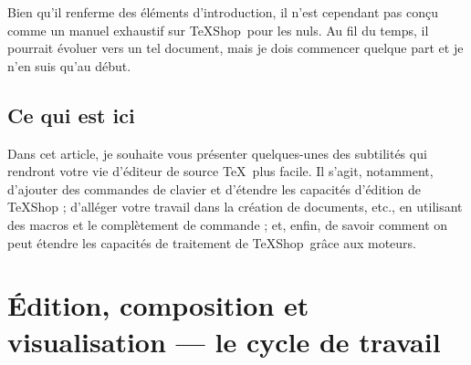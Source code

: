 \documentclass[11pt,french]{article}
\newcommand{\TS}{\textsf{\TeX Shop}}
\begin{document}
Bien qu'il renferme des éléments d'introduction, il n'est cependant pas conçu comme un manuel exhaustif sur \TS\ pour les nuls. Au fil du temps, il pourrait évoluer vers un tel document, mais je dois commencer quelque part et je n'en suis qu'au début.



\subsection{Ce qui est ici}

Dans cet article, je souhaite vous présenter quelques-unes des subtilités qui rendront votre vie d'éditeur de source \TeX\ plus facile. Il s'agit, notamment, d'ajouter des commandes de clavier et d'étendre les capacités d'édition de \TS{} ; d'alléger votre travail dans la création de documents, etc., en utilisant des macros et le complètement de commande ; et, enfin, de savoir comment on peut étendre les capacités de traitement de \TS\ grâce aux moteurs.



\section{Édition, composition et visualisation --- le cycle de travail}
\end{document}
